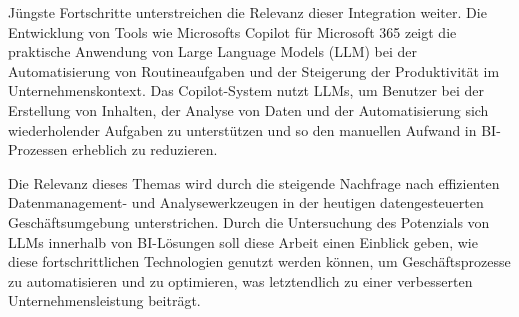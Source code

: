 Jüngste Fortschritte unterstreichen die Relevanz dieser Integration weiter. Die Entwicklung von Tools wie Microsofts Copilot für Microsoft 365 zeigt die praktische Anwendung von Large Language Models (LLM) bei der Automatisierung von Routineaufgaben und der Steigerung der Produktivität im Unternehmenskontext. Das Copilot-System nutzt LLMs, um Benutzer bei der Erstellung von Inhalten, der Analyse von Daten und der Automatisierung sich wiederholender Aufgaben zu unterstützen und so den manuellen Aufwand in BI-Prozessen erheblich zu reduzieren.

Die Relevanz dieses Themas wird durch die steigende Nachfrage nach effizienten Datenmanagement- und Analysewerkzeugen in der heutigen datengesteuerten Geschäftsumgebung unterstrichen. Durch die Untersuchung des Potenzials von LLMs innerhalb von BI-Lösungen soll diese Arbeit einen Einblick geben, wie diese fortschrittlichen Technologien genutzt werden können, um Geschäftsprozesse zu automatisieren und zu optimieren, was letztendlich zu einer verbesserten Unternehmensleistung beiträgt.

\newpage